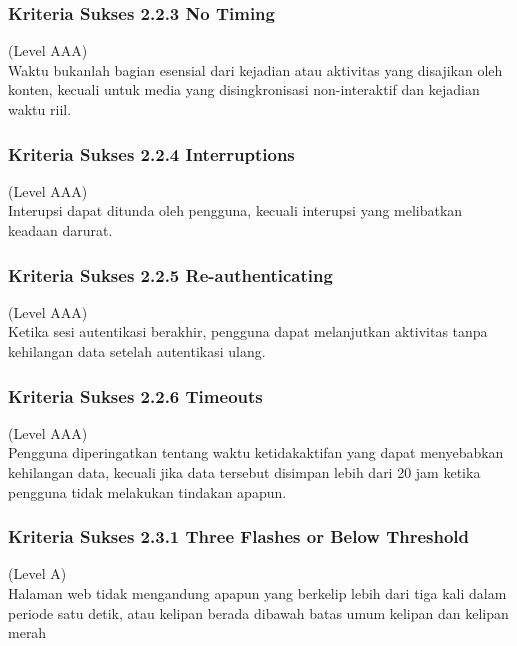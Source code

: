 \subsubsection{Kriteria Sukses 2.2.3 No Timing}
\label{sec:kriteria_2.2.3}
(Level AAA) \\

Waktu bukanlah bagian esensial dari kejadian atau aktivitas yang disajikan oleh konten, kecuali untuk media yang disingkronisasi non-interaktif dan kejadian waktu riil.

\subsubsection{Kriteria Sukses 2.2.4 Interruptions}
\label{sec:kriteria_2.2.4}
(Level AAA) \\

Interupsi dapat ditunda oleh pengguna, kecuali interupsi yang melibatkan keadaan darurat.

\subsubsection{Kriteria Sukses 2.2.5 Re-authenticating}
\label{sec:kriteria_2.2.5}
(Level AAA) \\

Ketika sesi autentikasi berakhir, pengguna dapat melanjutkan aktivitas tanpa kehilangan data setelah autentikasi ulang.

\subsubsection{Kriteria Sukses 2.2.6 Timeouts}
\label{sec:kriteria_2.2.6}
(Level AAA) \\

Pengguna diperingatkan tentang waktu ketidakaktifan yang dapat menyebabkan kehilangan data, kecuali jika data tersebut disimpan lebih dari 20 jam ketika pengguna tidak melakukan tindakan apapun.

\subsubsection{Kriteria Sukses 2.3.1 Three Flashes or Below Threshold}
\label{sec:kriteria_2.3.1}
(Level A) \\

Halaman web tidak mengandung apapun yang berkelip lebih dari tiga kali dalam periode satu detik, atau kelipan berada dibawah batas umum kelipan dan kelipan merah

